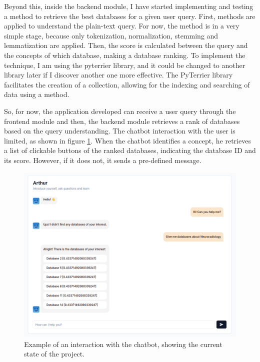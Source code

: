 Beyond this, inside the backend module, I have started implementing and testing a {\bm} method to retrieve the best databases for a given user query. First, {\nlp} methods are applied to understand the plain-text query. For now, the {\nlp} method is in a very simple stage, because only tokenization, normalization, stemming and lemmatization are applied. Then, the {\bm} score is calculated between the query and the concepts of which database, making a database ranking. To implement the {\ir} technique, I am using the pyterrier library, and it could be changed to another library later if I discover another one more effective. The PyTerrier library facilitates the creation of a collection, allowing for the indexing and searching of data using a {\bm} method.
 
So, for now, the application developed can receive a user query through the frontend module and then, the backend module retrieves a rank of databases based on the query understanding. The chatbot interaction with the user is limited, as shown in figure \ref{fig_interface}. When the chatbot identifies a concept, he retrieves a list of clickable buttons of the ranked databases, indicating the database ID and its {} score. However, if it does not, it sends a pre-defined message.

\begin{figure}[ht]
    \includegraphics[width=12cm]{figs/methodology/interface.png}
    \centering
    \caption{Example of an interaction with the chatbot, showing the current state of the project.}
    \label{fig_interface}
\end{figure}



